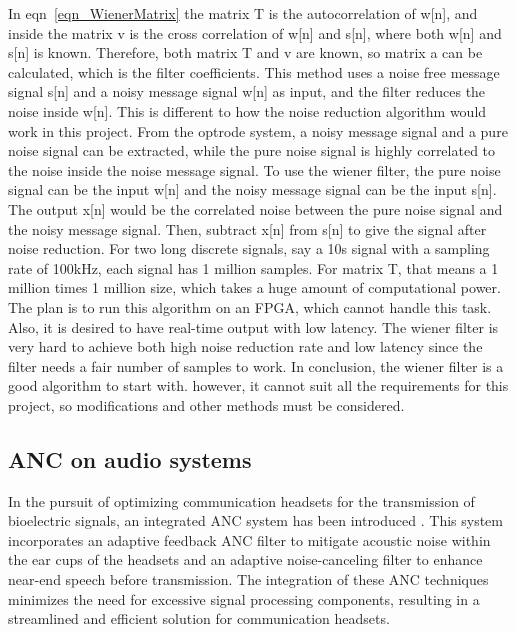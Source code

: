 In eqn~\ref{eqn_WienerMatrix} the matrix T is the autocorrelation of w[n], and inside the matrix v is the cross correlation of w[n] and s[n], where both w[n] and s[n] is known.  Therefore, both matrix T and v are known, so matrix a can be calculated, which is the filter coefficients.
This method uses a noise free message signal s[n] and a noisy message signal w[n] as input, and the filter reduces the noise inside w[n].  This is different to how the noise reduction algorithm would work in this project.  From the optrode system, a noisy message signal and a pure noise signal can be extracted, while the pure noise signal is highly correlated to the noise inside the noise message signal.  To use the wiener filter, the pure noise signal can be the input w[n] and the noisy message signal can be the input s[n].  The output x[n] would be the correlated noise between the pure noise signal and the noisy message signal.  Then, subtract x[n] from s[n] to give the signal after noise reduction.
For two long discrete signals, say a 10s signal with a sampling rate of 100kHz, each signal has 1 million samples.  For matrix T, that means a 1 million times 1 million size, which takes a huge amount of computational power.  The plan is to run this algorithm on an FPGA, which cannot handle this task.  Also, it is desired to have real-time output with low latency.  The wiener filter is very hard to achieve both high noise reduction rate and low latency since the filter needs a fair number of samples to work.
In conclusion, the wiener filter is a good algorithm to start with.  however, it cannot suit all the requirements for this project, so modifications and other methods must be considered.



\subsection{ANC on audio systems}

In the pursuit of optimizing communication headsets for the transmission of bioelectric signals, an integrated ANC system has been introduced \cite{ANC_Headphone_1}. This system incorporates an adaptive feedback ANC filter to mitigate acoustic noise within the ear cups of the headsets and an adaptive noise-canceling filter to enhance near-end speech before transmission. The integration of these ANC techniques minimizes the need for excessive signal processing components, resulting in a streamlined and efficient solution for communication headsets.

